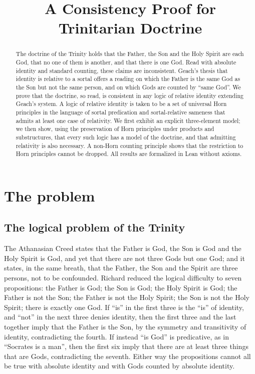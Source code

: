 \documentclass{situationist-preprint}
\title{A Consistency Proof for Trinitarian Doctrine}
\begin{document}
\maketitle

\begin{abstract}
The doctrine of the Trinity holds that the Father, the Son and the Holy Spirit are each God, that no one of them is another, and that there is one God. Read with absolute identity and standard counting, these claims are inconsistent. Geach's thesis that identity is relative to a sortal offers a reading on which the Father is the same God as the Son but not the same person, and on which Gods are counted by \enquote{same God}. We prove that the doctrine, so read, is consistent in any logic of relative identity extending Geach's system. A logic of relative identity is taken to be a set of universal Horn principles in the language of sortal predication and sortal-relative sameness that admits at least one case of relativity. We first exhibit an explicit three-element model; we then show, using the preservation of Horn principles under products and substructures, that every such logic has a model of the doctrine, and that admitting relativity is also necessary. A non-Horn counting principle shows that the restriction to Horn principles cannot be dropped. All results are formalized in Lean without axioms.
\end{abstract}

\section{The problem}

\subsection{The logical problem of the Trinity}

The Athanasian Creed states that the Father is God, the Son is God and the Holy Spirit is God, and yet that there are not three Gods but one God; and it states, in the same breath, that the Father, the Son and the Spirit are three persons, not to be confounded. Richard \citet{Cartwright1987} reduced the logical difficulty to seven propositions: the Father is God; the Son is God; the Holy Spirit is God; the Father is not the Son; the Father is not the Holy Spirit; the Son is not the Holy Spirit; there is exactly one God. If \enquote{is} in the first three is the \enquote{is} of identity, and \enquote{not} in the next three denies identity, then the first three and the last together imply that the Father is the Son, by the symmetry and transitivity of identity, contradicting the fourth. If instead \enquote{is God} is predicative, as in \enquote{Socrates is a man}, then the first six imply that there are at least three things that are Gods, contradicting the seventh. Either way the propositions cannot all be true with absolute identity and with Gods counted by absolute identity.
\end{document}
